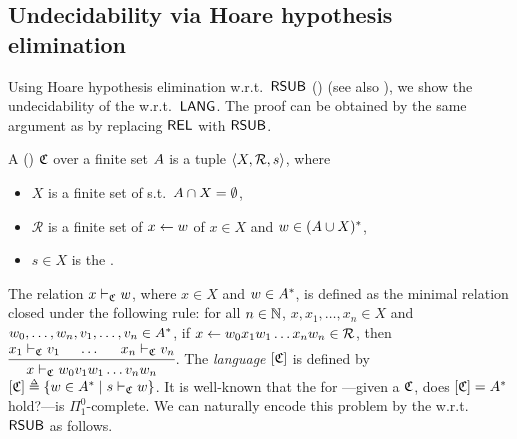 \subsection{Undecidability via Hoare hypothesis elimination}\label{section: undecidability}
Using Hoare hypothesis elimination w.r.t.\ $\mathsf{RSUB}$ () (see also ), we show the undecidability of the  w.r.t.\ $\mathsf{LANG}$.
The proof can be obtained by the same argument as \cite[Lem.\ 47]{nakamuraExistentialCalculiRelations2023} by replacing $\mathsf{REL}$ with $\mathsf{RSUB}$.

A \intro*{} () $\mathfrak{C}$ over a finite set $A$ is a tuple $\langle X, \mathcal{R}, s\rangle$, where
\begin{itemize}
    \item $X$ is a finite set of \intro*{} s.t.\ $A \cap X = \emptyset$,
    \item $\mathcal{R}$ is a finite set of \intro*{} $x \leftarrow \word[1]$ of $x \in X$ and $\word[1] \in (\CSIG \cup X)^*$,
    \item $s \in X$ is the \intro*{}.
\end{itemize}
The relation $x \vdash_{\CFG} \word[1]$, where $x \in X$ and $\word[1] \in \CSIG^*$, is defined as the minimal relation closed under the following rule:
for all $n \in \mathbb{N}$, $x, x_1, \dots, x_n \in X$ and $\word[1]_0, \dots, \word[1]_n, \word[2]_1, \dots, \word[2]_n \in \CSIG^*$, if $x \leftarrow \word[1]_0 x_1 \word[1]_1 \dots x_n \word[1]_n \in \mathcal{R}$, then $\begin{prooftree}
        \hypo{x_1 \vdash_{\CFG} \word[2]_1}
        \hypo{\dots}
        \hypo{x_n \vdash_{\CFG} \word[2]_n}
        \infer3{x \vdash_{\CFG} \word[1]_0 \word[2]_1 \word[1]_1 \dots \word[2]_n \word[1]_n}
    \end{prooftree}$.
The \emph{language} $[ \mathfrak{C} ]$ is defined by $\ljump{\CFG} \defeq \set{w \in \CSIG^* \mid s \vdash_{\CFG} w}$.
It is well-known that the \intro*{} for ---given a  $\mathfrak{C}$, does $[ \mathfrak{C} ] = A^*$ hold?---is $\Pi_{1}^{0}$-complete.
We can naturally encode this problem by the  w.r.t.\ $\mathsf{RSUB}$ as follows.

